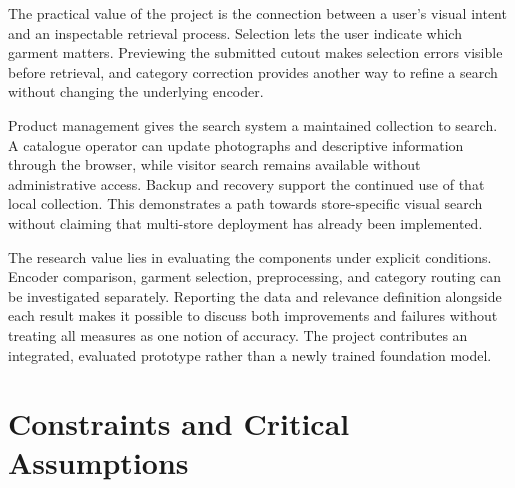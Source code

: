 The practical value of the project is the connection between a user's visual
intent and an inspectable retrieval process. Selection lets the user indicate
which garment matters. Previewing the submitted cutout makes selection errors
visible before retrieval, and category correction provides another way to refine
a search without changing the underlying encoder.

Product management gives the search system a maintained collection to search.
A catalogue operator can update photographs and descriptive information through
the browser, while visitor search remains available without administrative access.
Backup and recovery support the continued use of that local collection. This
demonstrates a path towards store-specific visual search without claiming that
multi-store deployment has already been implemented.

The research value lies in evaluating the components under explicit conditions.
Encoder comparison, garment selection, preprocessing, and category routing can
be investigated separately. Reporting the data and relevance definition alongside
each result makes it possible to discuss both improvements and failures without
treating all measures as one notion of accuracy. The project contributes an
integrated, evaluated prototype rather than a newly trained foundation model.

\section{Constraints and Critical Assumptions}
\label{sec:constraints}

